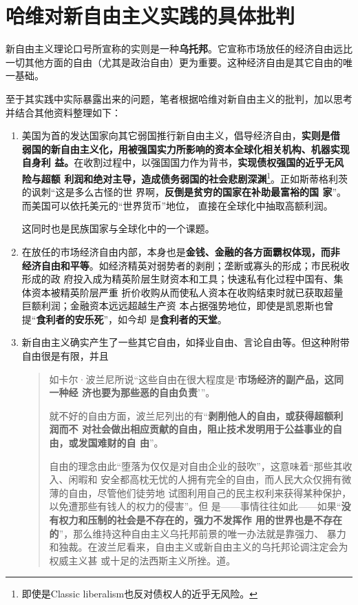 \section{哈维对新自由主义实践的具体批判}

新自由主义理论口号所宣称的实则是一种\textbf{乌托邦}。它宣称市场放任的经济自由远比
一切其他方面的自由（尤其是政治自由）更为重要。这种经济自由是其它自由的唯一基础。

至于其实践中实际暴露出来的问题，笔者根据哈维对新自由主义的批判，加以思考并结合其他资料整理如下：
\begin{enumerate}
\item 美国为首的发达国家向其它弱国推行新自由主义，倡导经济自由，\textbf{实则是借
    弱国的新自由主义化，用被强国实力所影响的资本全球化相关机构、机器实现自身利
    益。}在收割过程中，以强国国力作为背书，\textbf{实现债权强国的近乎无风险与超额
    利润和绝对主导，造成债务弱国的社会悲剧深渊}\footnote{即使是Classic
    liberalism也反对债权人的近乎无风险。}。正如斯蒂格利茨的讽刺“这是多么古怪的世
  界啊，\textbf{反倒是贫穷的国家在补助最富裕的国
    家}”。而美国可以依托美元的“世界货币”地位，
  直接在全球化中抽取高额利润。

  这同时也是民族国家与全球化中的一个课题。

\item 在放任的市场经济自由内部，本身也是\textbf{金钱、金融的各方面霸权体现，而非
    经济自由和平等}。如经济精英对弱势者的剥削；垄断或寡头的形成；市民税收形成的政
  府投入成为精英阶层生财资本和工具；快速私有化过程中国有、集体资本被精英阶层严重
  折价收购从而使私人资本在收购结束时就已获取超量巨额利润；金融资本远远超越生产资
  本占据强势地位，即使是凯恩斯也曾提“\textbf{食利者的安乐死}”，如今却
  是\textbf{食利者的天堂}。

\item 新自由主义确实产生了一些其它自由，如择业自由、言论自由等。但这种附带自由很是有限，并且

  \begin{quotation}
    如卡尔·波兰尼所说“这些自由在很大程度是‘\textbf{市场经济的副产品，这同一种经
      济也要为那些恶的自由负责}’”。

    就不好的自由方面，波兰尼列出的有“\textbf{剥削他人的自由，或获得超额利润而不
      对社会做出相应贡献的自由，阻止技术发明用于公益事业的自由，或发国难财的自
      由}”。

    自由的理念由此“堕落为仅仅是对自由企业的鼓吹”，这意味着“那些其收入、闲暇和
    安全都高枕无忧的人拥有完全的自由，而人民大众仅拥有微薄的自由，尽管他们徒劳地
    试图利用自己的民主权利来获得某种保护，以免遭那些有钱人的权力的侵害”。但
    是——事情往往如此——如果“\textbf{没有权力和压制的社会是不存在的，强力不发挥作
      用的世界也是不存在的}”，那么维持这种自由主义乌托邦前景的唯一办法就是靠强力、
    暴力和独裁。在波兰尼看来，自由主义或新自由主义的乌托邦论调注定会为权威主义甚
    或十足的法西斯主义所挫。道。
  \end{quotation}


\end{enumerate}

